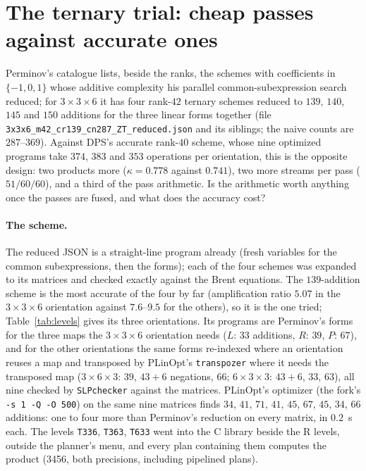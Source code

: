 \documentclass[11pt]{article}
\newcommand{\lv}[1]{\texttt{#1}}
\begin{document}
\section{The ternary trial: cheap passes against accurate ones}\label{sec:ternary}

Perminov's catalogue \cite{Perminov,Perminov25} lists, beside the ranks, the
schemes with coefficients in $\{-1,0,1\}$ whose additive complexity his
parallel common-subexpression search reduced; for $3\times3\times6$ it has four
rank-$42$ ternary schemes reduced to $139$, $140$, $145$ and $150$ additions
for the three linear forms together (file
\texttt{3x3x6\_m42\_cr139\_cn287\_ZT\_reduced.json} and its siblings; the
naive counts are $287$--$369$).  Against DPS's accurate rank-$40$ scheme,
whose nine optimized programs take $374$, $383$ and $353$ operations per
orientation, this is the opposite design: two products more ($\kappa=0.778$ against $0.741$), two more streams per pass ($51/60/60$), and a third of the
pass arithmetic.  Is the arithmetic worth anything once the passes are fused,
and what does the accuracy cost?

\paragraph{The scheme.}
The reduced JSON is a straight-line program already (fresh variables for the
common subexpressions, then the forms); each of the four schemes was expanded
to its matrices and checked exactly against the Brent equations.  The
$139$-addition scheme is the most accurate of the four by far (amplification
ratio $5.07$ in the $3\times3\times6$ orientation against $7.6$--$9.5$ for the
others), so it is the one tried; Table~\ref{tab:levels} gives its three
orientations.  Its programs are Perminov's forms for the three maps the
$3\times3\times6$ orientation needs ($L$: $33$ additions, $R$: $39$, $P$: $67$),
and for the other orientations the same forms re-indexed where an
orientation reuses a map and transposed by PLinOpt's \texttt{transpozer}
where it needs the transposed map ($3\times6\times3$: $39$, $43{+}6$ negations,
$66$; $6\times3\times3$: $43{+}6$, $33$, $63$), all nine checked by
\texttt{SLPchecker} against the matrices.  PLinOpt's optimizer (the fork's
\texttt{-s 1 -Q -O 500}) on the same nine matrices finds $34$, $41$, $71$,
$41$, $45$, $67$, $45$, $34$, $66$ additions: one to four more than Perminov's
reduction on every matrix, in $0.2$~s each.  The levels \lv{T336}, \lv{T363},
\lv{T633} went into the C library beside the R levels, outside the planner's
menu, and every plan containing them computes the product (3456, both
precisions, including pipelined plans).
\end{document}
